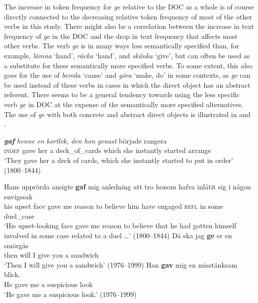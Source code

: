 \documentclass[output=paper]{langscibook}
\begin{document}
The increase in token frequency for \textit{ge} relative to the DOC as a whole is of course directly connected to the decreasing relative token frequency of most of the other verbs in this study. There might also be a correlation between the increase in text frequency of \textit{ge} in the DOC and the drop in text frequency that affects most other verbs. The verb \textit{ge} is in many ways less semantically specified than, for example, \textit{lämna} ‘hand’, \textit{räcka} ‘hand’, and \textit{skänka} ‘give’, but can often be used as a substitute for these semantically more specified verbs. To some extent, this also goes for the use of \textit{bereda} ‘cause’ and \textit{göra} ‘make, do’ in some contexts, as \textit{ge} can be used instead of these verbs in cases in which the direct object has an abstract referent. There seems to be a general tendency towards using the less specific verb \textit{ge} in DOC at the expense of the semantically more specified alternatives. The use of \textit{ge} with both concrete and abstract direct objects is illustrated in  and .


\ea \label{ex:valdeson:34}
\ea {} \textbf{\textit{gaf}} \textit{henne} \textit{en} \textit{kortlek,} \textit{den} \textit{hon} \textit{genast} började   rangera \\
 \textsc{indef}       gave     her     a   deck\_of\_cards    which    she instantly started           arrange\\ 
\glt ‘They gave her a deck of cards, which she instantly started to put in order’ (1800–1844)

\ex
\gll Hans   upprörda   ansigte \textbf{gaf} mig anledning   att   tro   honom hafva   inlåtit   sig   i   någon envigssak\\
 his       upset         face     gave   me   reason         to     believe  him         have       engaged \textsc{refl} in   some   duel\_case\\
\glt ‘His upset-looking face gave me reason to believe that he had gotten himself involved in some case related to a duel …’ (1800–1844)
\z
\ex \label{ex:valdeson:35}
\ea
\gll Då   ska   jag \textbf{ge} er     en smörgås\\
      then   will   I   give you   a   sandwich\\
      ‘Then I will give you a sandwich’ (1976–1999)
\ex
\gll Han \textbf{gav} mig   en misstänksam blick.\\
        He     gave   me     a   suspicious     look\\
        ‘He gave me a suspicious look.’ (1976–1999)
\z
\z
\end{document}
